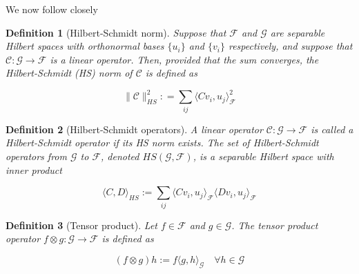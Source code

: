 \documentclass[12pt]{article}
\newtheorem{definition}{Definition}
\numberwithin{claim}{section}
\numberwithin{lemma}{section}
\numberwithin{theorem}{section}
\begin{document}
We now follow closely \cite{gretton2005measuring}

\begin{definition}[Hilbert-Schmidt norm]
Suppose that $\mathcal{F}$ and $\mathcal{G}$ are separable Hilbert spaces with orthonormal bases $\{u_i\}$ and $\{v_i\}$ respectively, and suppose that $\mathcal{C}: \mathcal{G} \longrightarrow \mathcal{F}$ is a linear operator. Then, provided that the sum converges, the Hilbert-Schmidt (HS) norm of $\mathcal{C}$ is defined as

\[ \|\mathcal{C}\|_{HS}^2 : = \sum_{ij} \langle Cv_i, u_j \rangle_\mathcal{F}^2 \]

\end{definition}

\begin{definition}[Hilbert-Schmidt operators]
A linear operator $\mathcal{C}: \mathcal{G} \longrightarrow \mathcal{F}$ is called a Hilbert-Schmidt operator if its HS norm exists. The set of Hilbert-Schmidt operators from $\mathcal{G}$ to $\mathcal{F}$, denoted $HS(\mathcal{G},\mathcal{F})$, is a separable Hilbert space with inner product

\[ \langle C, D \rangle_{HS} := \sum_{ij} \langle Cv_i,u_j\rangle_\mathcal{F} \langle Dv_i,u_j\rangle_\mathcal{F} \]

\end{definition}

\begin{definition}[Tensor product]
Let $f \in  \mathcal{F}$ and $g \in  \mathcal{G}$. The tensor product operator $f\otimes g :  \mathcal{G} \longrightarrow  \mathcal{F}$ is defined as

\[ (f\otimes g) h := f\langle g,h \rangle_\mathcal{G} \quad \forall h \in  \mathcal{G}\]

\end{definition}
\end{document}
